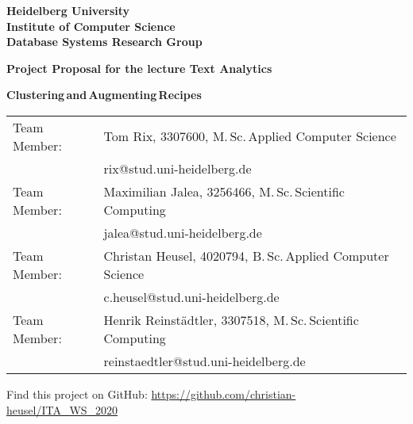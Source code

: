 \documentclass[
     12pt,         %
     a4paper,      %
     BCOR10mm,     %
     DIV14,        %
     ]{article}
\begin{document}
\begin{titlepage}


\vspace*{1cm}
\begin{center}
\vspace*{3cm}
\textbf{
\Large Heidelberg University\\
\smallskip
\Large Institute of Computer Science\\
\smallskip
\Large Database Systems Research Group\\
\smallskip
}

\vspace{3cm}

\textbf{\large Project Proposal for the lecture Text Analytics}

\vspace{0.5\baselineskip}
{\huge
\textbf{Clustering\,and\,Augmenting\,Recipes}
}
\end{center}

\vfill

{
    \hspace{-7mm}
\begin{tabular}[l]{ll}
    Team Member: & Tom Rix, 3307600, M.\,Sc.\,Applied Computer Science \\
                 & rix@stud.uni-heidelberg.de \\
    Team Member: & Maximilian Jalea, 3256466, M.\,Sc.\,Scientific Computing \\
                 & jalea@stud.uni-heidelberg.de\\
    Team Member: & Christan Heusel, 4020794, B.\,Sc.\,Applied Computer Science \\
                 & c.heusel@stud.uni-heidelberg.de \\
    Team Member: & Henrik Reinstädtler, 3307518, M.\,Sc.\,Scientific Computing \\
                 & reinstaedtler@stud.uni-heidelberg.de \\


\end{tabular}
}

\vspace{1cm}
\large \centering {} Find this project on GitHub: \url{https://github.com/christian-heusel/ITA_WS_2020}

\end{titlepage}
\end{document}
